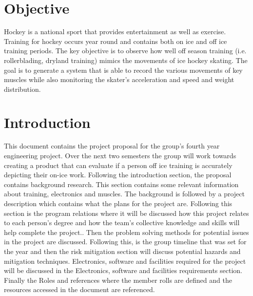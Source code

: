 \section{Objective}
\setlength{\parindent}{5ex}
\indent
Hockey is a national sport that provides entertainment as well as exercise. Training for hockey occurs year round and contains both on ice and off ice training periods. The key objective is to observe how well off season training (i.e. rollerblading, dryland training) mimics the movements of ice hockey skating. The goal is to generate a system that is able to record the various movements of key muscles while also monitoring the skater's acceleration and speed and weight distribution.
\section{Introduction}
This document contains the project proposal for the group's fourth year engineering project. Over the next two semesters the group will work towards creating a product that can evaluate if a person off ice training is accurately depicting their on-ice work.  Following the introduction section, the proposal contains background research. This section contains some relevant information about training, electronics and muscles. The background is followed by a project description which contains what the plans for the project are. Following this section is the program relations where it will be discussed how this project relates to each person’s degree and how the team’s collective knowledge and skills will help complete the project.. Then the problem solving methods for potential issues in the project are discussed. Following this, is the group timeline that was set for the year and then the risk mitigation section will discuss potential hazards and mitigation techniques. Electronics, software and facilities required for the project will be discussed in the Electronics, software and facilities requirements section. Finally the Roles and references where the member rolls are defined and the resources accessed in the document are referenced.
